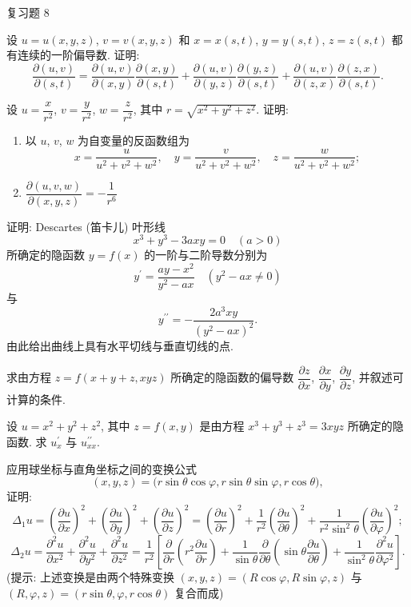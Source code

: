 \begin{exblock}{复习题 8}
\item 设 $u = u(x, y, z)$, $v = v(x, y, z)$ 和 $x = x(s, t)$, $y = y(s, t)$, $z = z(s, t)$ 都有连续的一阶偏导数. 证明:
\[
  \frac{\partial(u,v)}{\partial(s,t)} = \frac{\partial(u,v)}{\partial(x,y)}\frac{\partial(x,y)}{\partial(s,t)} + \frac{\partial(u,v)}{\partial(y,z)}\frac{\partial(y,z)}{\partial(s,t)} + \frac{\partial(u,v)}{\partial(z,x)}\frac{\partial(z,x)}{\partial(s,t)}.
\]

\item 设 $u = \dfrac{x}{r^{2}}$, $v = \dfrac{y}{r^{2}}$, $w = \dfrac{z}{r^{2}}$, 其中 $r = \sqrt{x^{2} + y^{2} + z^{2}}$. 证明:
\begin{enumerate}
  \item[(1)] 以 $u$, $v$, $w$ 为自变量的反函数组为
  \[
    x = \frac{u}{u^{2} + v^{2} + w^{2}}, \quad y = \frac{v}{u^{2} + v^{2} + w^{2}}, \quad z = \frac{w}{u^{2} + v^{2} + w^{2}};
  \]
  \item[(2)] $\displaystyle\dfrac{\partial(u,v,w)}{\partial(x,y,z)} = -\dfrac{1}{r^{6}}$
\end{enumerate}

\item 证明: Descartes (笛卡儿) 叶形线
\[
  x^{3} + y^{3} - 3axy = 0 \quad (a > 0)
\]
所确定的隐函数 $y = f(x)$ 的一阶与二阶导数分别为
\[
  y^{\prime} = \frac{ay - x^{2}}{y^{2} - ax} \quad (y^{2} - ax \neq 0)
\]
与
\[
  y^{\prime\prime} = -\frac{2a^{3}xy}{(y^{2} - ax)^{2}}.
\]
由此给出曲线上具有水平切线与垂直切线的点.

\item 求由方程 $z = f(x + y + z, xyz)$ 所确定的隐函数的偏导数 $\dfrac{\partial z}{\partial x}$, $\dfrac{\partial x}{\partial y}$, $\dfrac{\partial y}{\partial z}$, 并叙述可计算的条件.

\item 设 $u = x^{2} + y^{2} + z^{2}$, 其中 $z = f(x, y)$ 是由方程 $x^{3} + y^{3} + z^{3} = 3xyz$ 所确定的隐函数. 求 $u_{x}^{\prime}$ 与 $u_{xx}^{\prime\prime}$.

\item 应用球坐标与直角坐标之间的变换公式
\[
  (x,y,z) = \bigl(r\sin\theta\cos\varphi, r\sin\theta\sin\varphi, r\cos\theta\bigr),
\]
证明:
\[
  \Delta_{1}u = \left(\frac{\partial u}{\partial x}\right)^{2} + \left(\frac{\partial u}{\partial y}\right)^{2} + \left(\frac{\partial u}{\partial z}\right)^{2} = \left(\frac{\partial u}{\partial r}\right)^{2} + \frac{1}{r^{2}}\left(\frac{\partial u}{\partial \theta}\right)^{2} + \frac{1}{r^{2}\sin^{2}\theta}\left(\frac{\partial u}{\partial \varphi}\right)^{2};
\]
\[
  \Delta_{2}u = \frac{\partial^{2}u}{\partial x^{2}} + \frac{\partial^{2}u}{\partial y^{2}} + \frac{\partial^{2}u}{\partial z^{2}} = \frac{1}{r^{2}}\left[\frac{\partial}{\partial r}\left(r^{2}\frac{\partial u}{\partial r}\right) + \frac{1}{\sin\theta}\frac{\partial}{\partial\theta}\left(\sin\theta\frac{\partial u}{\partial\theta}\right) + \frac{1}{\sin^{2}\theta}\frac{\partial^{2}u}{\partial\varphi^{2}}\right].
\]
(提示: 上述变换是由两个特殊变换 $(x,y,z) = (R\cos\varphi, R\sin\varphi, z)$ 与 $(R,\varphi,z) = (r\sin\theta, \varphi, r\cos\theta)$ 复合而成)


\end{exblock}
